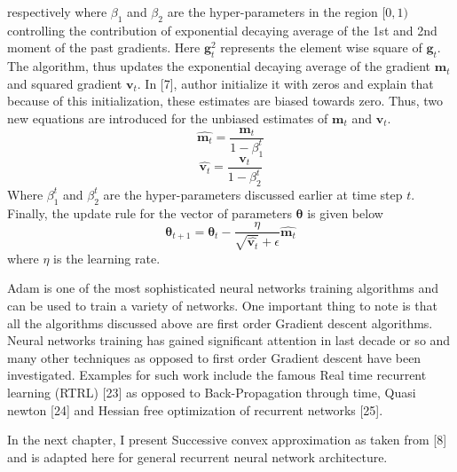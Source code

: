 respectively where $\beta_{1}$ and $\beta_{2}$ are the hyper-parameters in the region $[0,1)$ controlling the contribution of exponential decaying average of the 1st and 2nd moment of the past gradients. Here $\textbf{g}_t^2$ represents the element wise square of $\textbf{g}_t$. 
The algorithm, thus updates the exponential decaying average of the gradient $\textbf{m}_t$ and squared gradient $\textbf{v}_t$. In [7], author initialize it with zeros and explain that because of this initialization, these estimates are biased towards zero. Thus, two new equations are introduced for the unbiased estimates of $\textbf{m}_t$ and $\textbf{v}_t$. 
\begin{equation}
\hat{\textbf{m}_t} = \dfrac{\textbf{m}_t}{1-\beta_{1}^t}
\end{equation}
\begin{equation}
\hat{\textbf{v}_t} = \dfrac{\textbf{v}_t}{1-\beta_{2}^t}
\end{equation}
Where $\beta_{1}^t$ and $\beta_{2}^t$ are the hyper-parameters discussed earlier at time step $t$. 
Finally, the update rule for the vector of parameters $\bm{\theta}$ is given below
\begin{equation}
\bm{\theta}_{t+1} = \bm{\theta}_{t} - \dfrac{\eta}{\sqrt{\hat{\textbf{v}_t}}+\epsilon} \hat{\textbf{m}_t}
\end{equation}
where $\eta$ is the learning rate.
 
Adam is one of the most sophisticated neural networks training algorithms and can be used to train a variety of networks. One important thing to note is that all the algorithms discussed above are first order Gradient descent algorithms. Neural networks training has gained significant attention in last decade or so and many other techniques as opposed to first order Gradient descent have been investigated. Examples for such work include the famous Real time recurrent learning (RTRL) [23] as opposed to Back-Propagation through time, Quasi newton [24] and Hessian free optimization of recurrent networks [25].  

In the next chapter, I present Successive convex approximation as taken from [8] and is adapted here for general recurrent neural network architecture. 
 